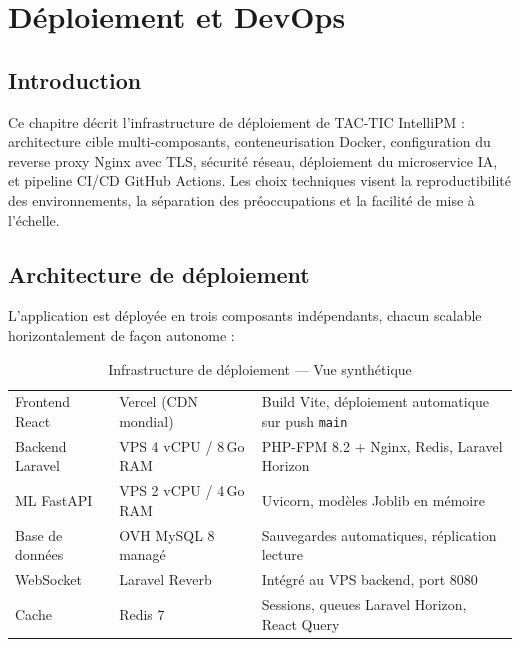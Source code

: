 \chapter{Déploiement et DevOps}

\section*{Introduction}
\begin{chapintro}
Ce chapitre décrit l'infrastructure de déploiement de TAC-TIC IntelliPM :
architecture cible multi-composants, conteneurisation Docker, configuration
du reverse proxy Nginx avec TLS, sécurité réseau, déploiement du microservice
IA, et pipeline CI/CD GitHub Actions. Les choix techniques visent la reproductibilité
des environnements, la séparation des préoccupations et la facilité de mise à l'échelle.
\end{chapintro}

\section{Architecture de déploiement}

L'application est déployée en trois composants indépendants, chacun scalable
horizontalement de façon autonome :

\begin{table}[H]
  \centering
  \caption{Infrastructure de déploiement — Vue synthétique}
  \label{tab:infra_deploiement}
  \begin{tabularx}{\textwidth}{L{3cm}L{4cm}X}
    \toprule
     &  &  \\
    \midrule
    Frontend React    & Vercel (CDN mondial)    & Build Vite, déploiement automatique sur push \texttt{main} \\
    Backend Laravel   & VPS 4 vCPU / 8\,Go RAM & PHP-FPM 8.2 + Nginx, Redis, Laravel Horizon \\
    ML FastAPI        & VPS 2 vCPU / 4\,Go RAM & Uvicorn, modèles Joblib en mémoire \\
    Base de données   & OVH MySQL 8 managé      & Sauvegardes automatiques, réplication lecture \\
    WebSocket         & Laravel Reverb          & Intégré au VPS backend, port 8080 \\
    Cache             & Redis 7                 & Sessions, queues Laravel Horizon, React Query \\
    \bottomrule
  \end{tabularx}
\end{table}

